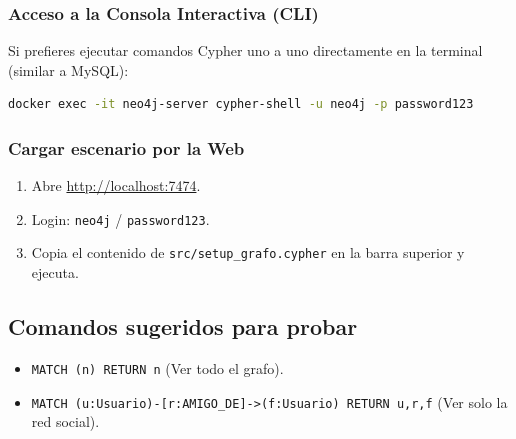 \documentclass[12pt,a4paper]{article}
\begin{document}
\subsubsection{Acceso a la Consola Interactiva (CLI)}\label{acceso-consola}

Si prefieres ejecutar comandos Cypher uno a uno directamente en la terminal (similar a MySQL):

\begin{lstlisting}[language=bash]
docker exec -it neo4j-server cypher-shell -u neo4j -p password123
\end{lstlisting}

\subsubsection{Cargar escenario por la Web}\label{cargar-escenario-por-la-web}

\begin{enumerate}
    \item Abre \url{http://localhost:7474}.
    \item Login: \texttt{neo4j} / \texttt{password123}.
    \item Copia el contenido de \texttt{src/setup\_grafo.cypher} en la barra superior y ejecuta.
\end{enumerate}

\subsection{Comandos sugeridos para probar}\label{comandos-sugeridos-para-probar}

\begin{itemize}
    \item \texttt{MATCH (n) RETURN n} (Ver todo el grafo).
    \item \texttt{MATCH (u:Usuario)-[r:AMIGO\_DE]->(f:Usuario) RETURN u,r,f} (Ver solo la red social).
\end{itemize}
\end{document}
